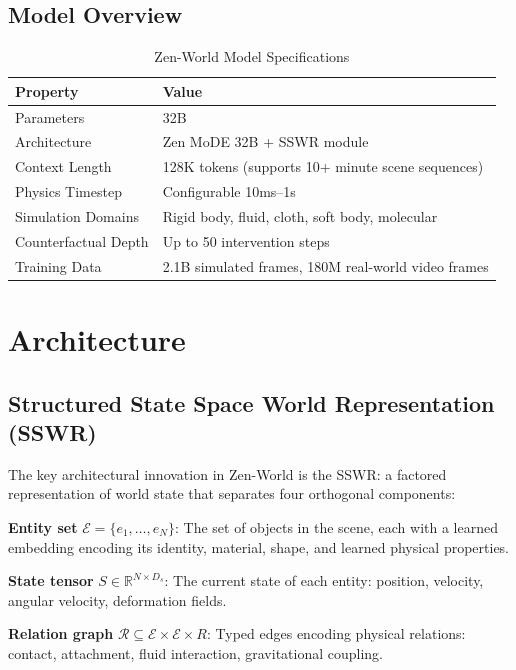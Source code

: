 \documentclass[11pt,a4paper]{article}
\begin{document}
\subsection{Model Overview}

\begin{table}[H]
\centering
\begin{tabular}{ll}
\toprule
\textbf{Property} & \textbf{Value} \\
\midrule
Parameters & 32B \\
Architecture & Zen MoDE 32B + SSWR module \\
Context Length & 128K tokens (supports 10+ minute scene sequences) \\
Physics Timestep & Configurable 10ms--1s \\
Simulation Domains & Rigid body, fluid, cloth, soft body, molecular \\
Counterfactual Depth & Up to 50 intervention steps \\
Training Data & 2.1B simulated frames, 180M real-world video frames \\
\bottomrule
\end{tabular}
\caption{Zen-World Model Specifications}
\end{table}

\section{Architecture}

\subsection{Structured State Space World Representation (SSWR)}

The key architectural innovation in Zen-World is the SSWR: a factored representation of world
state that separates four orthogonal components:

\textbf{Entity set} $\mathcal{E} = \{e_1, \ldots, e_N\}$: The set of objects in the scene,
each with a learned embedding encoding its identity, material, shape, and learned physical
properties.

\textbf{State tensor} $S \in \mathbb{R}^{N \times D_s}$: The current state of each entity:
position, velocity, angular velocity, deformation fields.

\textbf{Relation graph} $\mathcal{R} \subseteq \mathcal{E} \times \mathcal{E} \times R$: Typed
edges encoding physical relations: contact, attachment, fluid interaction, gravitational coupling.
\end{document}

